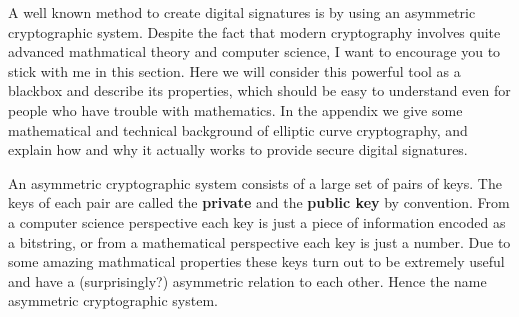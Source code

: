 \documentclass[a4paper,12pt,oneside,openany]{book}
\begin{document}
A well known method to create digital signatures is by using an \gls{asymmetric cryptographic system}.
Despite the fact that modern cryptography involves quite advanced mathmatical theory and computer science, I want to encourage you to stick with me in this section.
Here we will consider this powerful tool as a blackbox and describe its properties, which should be easy to understand even for people who have trouble with mathematics.
In the appendix we give some mathematical and technical background of elliptic curve cryptography, and explain how and why it actually works to provide secure digital signatures.

An asymmetric cryptographic system consists of a large set of pairs of keys.
The keys of each pair are called the \textbf{private} and the \textbf{public key} by convention.
From a computer science perspective each key is just a piece of information encoded as a bitstring, or from a mathematical perspective each key is just a number.
Due to some amazing mathmatical properties these keys turn out to be extremely useful and have a (surprisingly?) asymmetric relation to each other.
Hence the name asymmetric cryptographic system.
\end{document}
